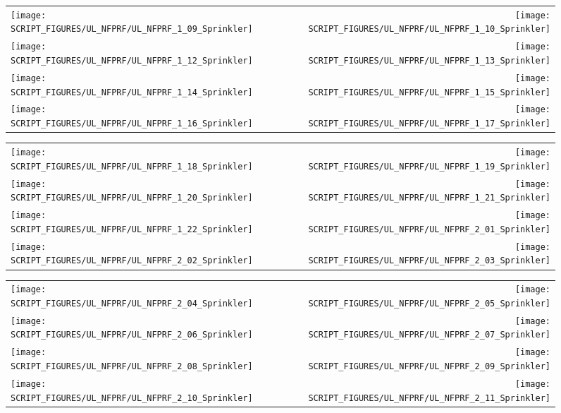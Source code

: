 \begin{figure}[p]
\begin{tabular*}{\textwidth}{l@{\extracolsep{\fill}}r}
\texttt{[image: SCRIPT\_FIGURES/UL\_NFPRF/UL\_NFPRF\_1\_09\_Sprinkler]} &
\texttt{[image: SCRIPT\_FIGURES/UL\_NFPRF/UL\_NFPRF\_1\_10\_Sprinkler]} \\
\texttt{[image: SCRIPT\_FIGURES/UL\_NFPRF/UL\_NFPRF\_1\_12\_Sprinkler]} &
\texttt{[image: SCRIPT\_FIGURES/UL\_NFPRF/UL\_NFPRF\_1\_13\_Sprinkler]} \\
\texttt{[image: SCRIPT\_FIGURES/UL\_NFPRF/UL\_NFPRF\_1\_14\_Sprinkler]} &
\texttt{[image: SCRIPT\_FIGURES/UL\_NFPRF/UL\_NFPRF\_1\_15\_Sprinkler]} \\
\texttt{[image: SCRIPT\_FIGURES/UL\_NFPRF/UL\_NFPRF\_1\_16\_Sprinkler]} &
\texttt{[image: SCRIPT\_FIGURES/UL\_NFPRF/UL\_NFPRF\_1\_17\_Sprinkler]}
\end{tabular*}
\end{figure}

\begin{figure}[p]
\begin{tabular*}{\textwidth}{l@{\extracolsep{\fill}}r}
\texttt{[image: SCRIPT\_FIGURES/UL\_NFPRF/UL\_NFPRF\_1\_18\_Sprinkler]} &
\texttt{[image: SCRIPT\_FIGURES/UL\_NFPRF/UL\_NFPRF\_1\_19\_Sprinkler]} \\
\texttt{[image: SCRIPT\_FIGURES/UL\_NFPRF/UL\_NFPRF\_1\_20\_Sprinkler]} &
\texttt{[image: SCRIPT\_FIGURES/UL\_NFPRF/UL\_NFPRF\_1\_21\_Sprinkler]} \\
\texttt{[image: SCRIPT\_FIGURES/UL\_NFPRF/UL\_NFPRF\_1\_22\_Sprinkler]} &
\texttt{[image: SCRIPT\_FIGURES/UL\_NFPRF/UL\_NFPRF\_2\_01\_Sprinkler]} \\
\texttt{[image: SCRIPT\_FIGURES/UL\_NFPRF/UL\_NFPRF\_2\_02\_Sprinkler]} &
\texttt{[image: SCRIPT\_FIGURES/UL\_NFPRF/UL\_NFPRF\_2\_03\_Sprinkler]}
\end{tabular*}
\end{figure}

\begin{figure}[p]
\begin{tabular*}{\textwidth}{l@{\extracolsep{\fill}}r}
\texttt{[image: SCRIPT\_FIGURES/UL\_NFPRF/UL\_NFPRF\_2\_04\_Sprinkler]} &
\texttt{[image: SCRIPT\_FIGURES/UL\_NFPRF/UL\_NFPRF\_2\_05\_Sprinkler]} \\
\texttt{[image: SCRIPT\_FIGURES/UL\_NFPRF/UL\_NFPRF\_2\_06\_Sprinkler]} &
\texttt{[image: SCRIPT\_FIGURES/UL\_NFPRF/UL\_NFPRF\_2\_07\_Sprinkler]} \\
\texttt{[image: SCRIPT\_FIGURES/UL\_NFPRF/UL\_NFPRF\_2\_08\_Sprinkler]} &
\texttt{[image: SCRIPT\_FIGURES/UL\_NFPRF/UL\_NFPRF\_2\_09\_Sprinkler]} \\
\texttt{[image: SCRIPT\_FIGURES/UL\_NFPRF/UL\_NFPRF\_2\_10\_Sprinkler]} &
\texttt{[image: SCRIPT\_FIGURES/UL\_NFPRF/UL\_NFPRF\_2\_11\_Sprinkler]}
\end{tabular*}
\end{figure}

